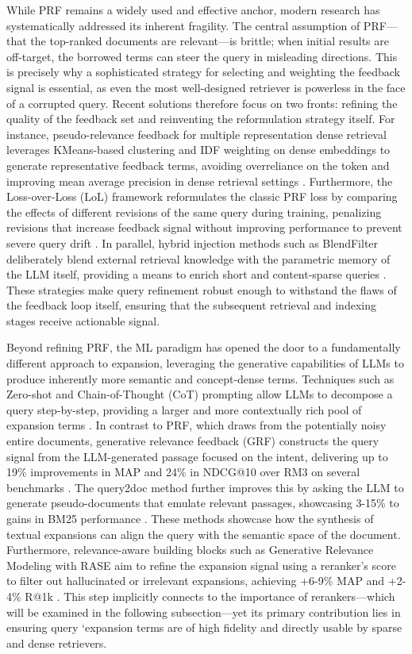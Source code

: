\documentclass[11pt]{article}
\begin{document}
While PRF remains a widely used and effective anchor, modern research has systematically addressed its inherent fragility. The central assumption of PRF---that the top-ranked documents are relevant---is brittle; when initial results are off-target, the borrowed terms can steer the query in misleading directions. This is precisely why a sophisticated strategy for selecting and weighting the feedback signal is essential, as even the most well-designed retriever is powerless in the face of a corrupted query. Recent solutions therefore focus on two fronts: refining the quality of the feedback set and reinventing the reformulation strategy itself. For instance, pseudo-relevance feedback for multiple representation dense retrieval leverages KMeans-based clustering and IDF weighting on dense embeddings to generate representative feedback terms, avoiding overreliance on the \cite{ref97} token and improving mean average precision in dense retrieval settings \cite{ref98}. Furthermore, the Loss-over-Loss (LoL) framework reformulates the classic PRF loss by comparing the effects of different revisions of the same query during training, penalizing revisions that increase feedback signal without improving performance to prevent severe query drift \cite{ref99}. In parallel, hybrid injection methods such as BlendFilter deliberately blend external retrieval knowledge with the parametric memory of the LLM itself, providing a means to enrich short and content-sparse queries \cite{ref100}. These strategies make query refinement robust enough to withstand the flaws of the feedback loop itself, ensuring that the subsequent retrieval and indexing stages receive actionable signal.

Beyond refining PRF, the ML paradigm has opened the door to a fundamentally different approach to expansion, leveraging the generative capabilities of LLMs to produce inherently more semantic and concept-dense terms. Techniques such as Zero-shot and Chain-of-Thought (CoT) prompting allow LLMs to decompose a query step-by-step, providing a larger and more contextually rich pool of expansion terms \cite{ref101}. In contrast to PRF, which draws from the potentially noisy entire documents, generative relevance feedback (GRF) constructs the query signal from the LLM-generated passage focused on the intent, delivering up to 19\% improvements in MAP and 24\% in NDCG@10 over RM3 on several benchmarks \cite{ref102}. The query2doc method further improves this by asking the LLM to generate pseudo-documents that emulate relevant passages, showcasing 3-15\% to gains in BM25 performance \cite{ref103}. These methods showcase how the synthesis of textual expansions can align the query with the semantic space of the document. Furthermore, relevance-aware building blocks such as Generative Relevance Modeling with RASE aim to refine the expansion signal using a reranker's score to filter out hallucinated or irrelevant expansions, achieving +6-9\% MAP and +2-4\% R@1k \cite{ref104}. This step implicitly connects to the importance of rerankers---which will be examined in the following subsection---yet its primary contribution lies in ensuring query `expansion terms are of high fidelity and directly usable by sparse and dense retrievers.
\end{document}
